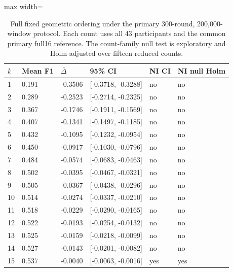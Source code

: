 \begin{table}[htbp]
\centering\small
\caption{Full fixed geometric ordering under the primary 300-round, 200,000-window protocol. Each count uses all 43 participants and the common primary full16 reference.  The count-family null test is exploratory and Holm-adjusted over fifteen reduced counts.}\label{tab:geometriccurve}
\begin{adjustbox}{max width=\textwidth}
\begin{tabular}{llllll}\toprule
$k$ & Mean F1 & $\bar\Delta$ & 95\% CI & NI CI & NI null Holm\\\midrule
1 & 0.191 & -0.3506 & [-0.3718, -0.3288] & no & no\\
2 & 0.289 & -0.2523 & [-0.2714, -0.2325] & no & no\\
3 & 0.367 & -0.1746 & [-0.1911, -0.1569] & no & no\\
4 & 0.407 & -0.1341 & [-0.1497, -0.1185] & no & no\\
5 & 0.432 & -0.1095 & [-0.1232, -0.0954] & no & no\\
6 & 0.450 & -0.0917 & [-0.1030, -0.0796] & no & no\\
7 & 0.484 & -0.0574 & [-0.0683, -0.0463] & no & no\\
8 & 0.502 & -0.0395 & [-0.0467, -0.0321] & no & no\\
9 & 0.505 & -0.0367 & [-0.0438, -0.0296] & no & no\\
10 & 0.514 & -0.0274 & [-0.0337, -0.0210] & no & no\\
11 & 0.518 & -0.0229 & [-0.0290, -0.0165] & no & no\\
12 & 0.522 & -0.0193 & [-0.0254, -0.0132] & no & no\\
13 & 0.525 & -0.0159 & [-0.0218, -0.0099] & no & no\\
14 & 0.527 & -0.0143 & [-0.0201, -0.0082] & no & no\\
15 & 0.537 & -0.0040 & [-0.0063, -0.0016] & yes & yes\\
\bottomrule\end{tabular}
\end{adjustbox}
\end{table}
